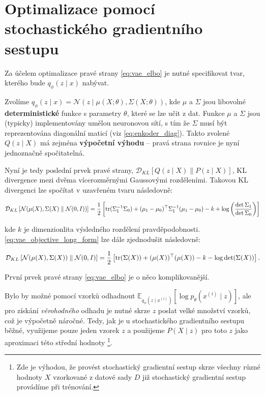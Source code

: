 \section{Optimalizace pomocí stochastického gradientního sestupu}
\label{sec:vae_optimization}

Za účelem optimalizace pravé strany \autoref{eq:vae_elbo} je nutné specifikovat tvar, kterého bude $q_\phi(z\mid x)$ nabývat.

Zvolíme $q_\phi(z\mid x) = \mathcal{N}(z\mid \mu(X;\theta),\Sigma(X;\theta))$, kde $\mu$ a $\Sigma$ jsou libovolné \textbf{deterministické} funkce s parametry $\theta$, které se lze učit z dat.
Funkce $\mu$ a $\Sigma$ jsou (typicky) implementovány umělou neuronovou sítí, s tím že $\Sigma$ musí být reprezentována diagonální maticí (viz \autoref{eq:enkoder_diag}).
Takto zvolené $Q(z\mid X)$ má zejména \textbf{výpočetní výhodu} – pravá strana rovnice je nyní jednoznačně spočitatelná.

Nyní je tedy poslední prvek pravé strany, $\mathcal{D}_{KL}\left[ Q(z \mid X)\parallel P(z\mid X) \right]$, KL divergence mezi dvěma vícerozměrnými Gaussovými rozděleními.
Takovou KL divergenci lze spočítat v uzavřeném tvaru následovně:

\begin{equation}\label{eq:vae_objective_long_form}
    \mathcal{D}_{KL} \left[ \mathcal{N}(\mu(X), \Sigma(X)\parallel \mathcal{N}(0, I)) \right] = 
    \frac{1}{2}\left[ \operatorname{\text{tr}} (\Sigma_1^{-1}\Sigma_0) + (\mu_1 - \mu_0)^\top \Sigma_1^{-1}(\mu_1 - \mu_0) - k + \log \left(\frac{\det \Sigma_1}{\det \Sigma_0} \right) \right]
\end{equation}

kde $k$ je dimenzionlita výsledného rozdělení pravděpodobnosti. \autoref{eq:vae_objective_long_form} lze dále zjednodušit následovně:

\begin{equation}
    \mathcal{D}_{KL} \left[ \mathcal{N}(\mu(X), \Sigma(X)) \parallel \mathcal{N}(0, I) \right] = 
    \frac{1}{2} \left[ \operatorname{\text{tr}} (\Sigma(X)) + (\mu(X))^\top (\mu(X)) - k - \log \det (\Sigma(X)) \right].
\end{equation}

První prvek pravé strany \autoref{eq:vae_elbo} je o něco komplikovanější.

Bylo by možné pomocí vzorků odhadnout $\mathds{E}_{q_\phi(z\mid x^{(i)})} \left[ \log p_\theta(x^{(i)}\mid z) \right]$, ale pro získání \emph{věrohodného} odhadu je nutné skrze $z$ poslat velké množství vzorků, což je výpočetně náročné.
Tedy, jak je u stochastického gradientního sestupu běžné, využijeme pouze jeden vzorek $z$ a použijeme $P(X\mid z)$ pro toto $z$ jako aproximaci této střední hodnoty
\footnote{Zde je výhodou, že provést stochastický gradientní sestup skrze všechny různé hodnoty $X$ vzorkované z datové sady $D$ již stochastický gradientní sestup provádíme při trénování.}.


